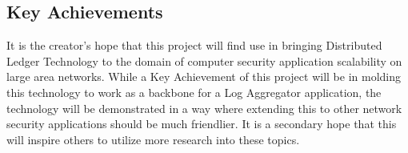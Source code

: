 	\subsection{Key Achievements} 
		\hspace{10mm}It is the creator's hope that this project will find use in bringing Distributed Ledger Technology to the domain of computer security application scalability on large area networks. While a Key Achievement of this project will be in molding this technology to work as a backbone for a Log Aggregator application, the technology will be demonstrated in a way where extending this to other network security applications should be much friendlier. It is a secondary hope that this will inspire others to utilize more research into these topics.\\